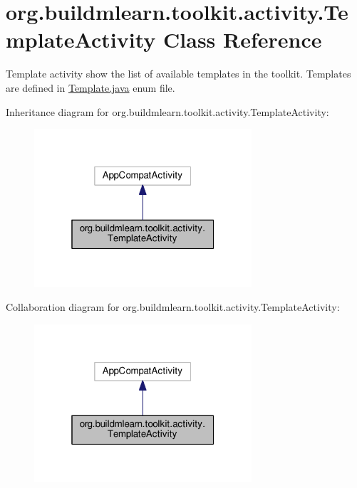 \hypertarget{classorg_1_1buildmlearn_1_1toolkit_1_1activity_1_1TemplateActivity}{}\section{org.\+buildmlearn.\+toolkit.\+activity.\+Template\+Activity Class Reference}
\label{classorg_1_1buildmlearn_1_1toolkit_1_1activity_1_1TemplateActivity}


Template activity show the list of available templates in the toolkit. Templates are defined in \hyperlink{Template_8java}{Template.\+java} enum file.  




Inheritance diagram for org.\+buildmlearn.\+toolkit.\+activity.\+Template\+Activity\+:
\nopagebreak
\begin{figure}[H]
\begin{center}
\leavevmode
\includegraphics[width=229pt]{classorg_1_1buildmlearn_1_1toolkit_1_1activity_1_1TemplateActivity__inherit__graph}
\end{center}
\end{figure}


Collaboration diagram for org.\+buildmlearn.\+toolkit.\+activity.\+Template\+Activity\+:
\nopagebreak
\begin{figure}[H]
\begin{center}
\leavevmode
\includegraphics[width=229pt]{classorg_1_1buildmlearn_1_1toolkit_1_1activity_1_1TemplateActivity__coll__graph}
\end{center}
\end{figure}
